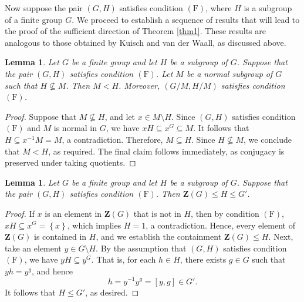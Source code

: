 \documentclass[twoside,a4paper,reqno,11pt]{amsart}
\newcommand{\<}{\langle}
\renewcommand{\>}{\rangle}
\newcommand{\leqs}{\leqslant}
\newcommand{\z}{\mathbf{Z}}
\newcommand{\F}{\mathrm{(F)}}
\renewcommand{\leq}{\leqs}
\renewcommand{\:}{\colon}
\newtheorem{lem}[thm]{Lemma}
\theoremstyle{definition}
\begin{document}
Now suppose the pair $(G,H)$ satisfies condition $\F$, where $H$ is a subgroup of a finite group $G$.  We proceed to establish a sequence of results that will lead to the proof of the sufficient direction of Theorem \ref{thm1}. These results are analogous to those obtained by Kuisch and van der Waall, as discussed above.



\begin{lem} \label{lemma6}
Let $G$ be a finite group and let $H$ be a subgroup of $G$.	Suppose that the pair $(G,H)$ satisfies condition $\F$. Let $M$ be a normal subgroup of $G$ such that $H\nsubseteq M$. Then $M < H$. Moreover, $(G/M, H/M)$ satisfies condition $\F$. 
\end{lem}

\begin{proof}
Suppose that $M\nsubseteq H$, and  let  $x\in M\setminus H$. Since $(G,H)$ satisfies condition $\F$ and $M$ is normal in $G$, we have $xH\subseteq x^G\subseteq M$. It follows that $H\subseteq x^{-1}M = M$, a contradiction. Therefore, $M\subseteq H$. Since $H\not\subseteq M$, we conclude that $M<H$, as required. The final claim follows immediately, as conjugacy is preserved under taking quotients. 
\end{proof}

\begin{lem} \label{corol7}
Let $G$ be a finite group and let $H$ be a subgroup of $G$.	Suppose that the pair $(G,H)$ satisfies condition $\F$. Then $\z(G)\leq H\leq G'$.  
\end{lem}
\begin{proof}
If $x$ is an element in $ \z(G)$ that is not in $H$, then by condition $\F$, $xH \subseteq x^G = \left\{x\right\}$, which implies $H = 1$, a contradiction. Hence, every element of $\z(G)$ is contained in $H$, and we establish the containment $\z(G)\leq H$. Next,  take an element $y\in  G\setminus H$. By the assumption that $(G,H)$ satisfies condition $\F$, we have  $yH \subseteq y^G$. That is, for each $h\in H$, there exists $g\in G$ such that $yh = y^g$, and hence $$h = y^{-1}y^g = [y,g] \in G'.$$ It follows that $H\leq G'$, as desired.   
\end{proof}
\end{document}

